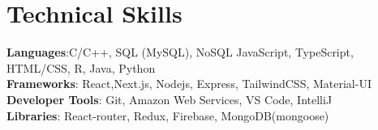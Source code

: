 \documentclass[letterpaper,11pt]{article}
\begin{document}
\section{Technical Skills}
 \begin{itemize}[leftmargin=0.15in, label={}]
    \small{\item{
     \textbf{Languages}{:C/C++, SQL (MySQL), NoSQL JavaScript, TypeScript, HTML/CSS, R, Java, Python} \\
     \textbf{Frameworks}{: React,Next.js, Nodejs, Express, TailwindCSS, Material-UI} \\
     \textbf{Developer Tools}{: Git, Amazon Web Services, VS Code, IntelliJ} \\
     \textbf{Libraries}{: React-router, Redux, Firebase, MongoDB(mongoose) }
    }}
 \end{itemize}


\end{document}
